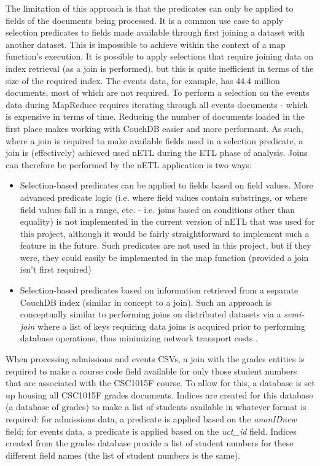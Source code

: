 The limitation of this approach is that the predicates can only be applied to fields of the documents being processed. It is a common use case to apply selection predicates to fields made available through first joining a dataset with another dataset. This is impossible to achieve within the context of a map function’s execution. It is possible to apply selections that require joining data on index retrieval (as a join is performed), but this is quite inefficient in terms of the size of the required index. The events data, for example, has 44.4 million documents, most of which are not required. To perform a selection on the events data during MapReduce requires iterating through all events documents - which is expensive in terms of time. Reducing the number of documents loaded in the first place makes working with CouchDB easier and more performant. As such, where a join is required to make available fields used in a selection predicate, a join is (effectively) achieved used nETL during the ETL phase of analysis. Joins can therefore be performed by the nETL application is two ways:

\begin{itemize}
  \item Selection-based predicates can be applied to fields based on field values. More advanced predicate logic (i.e. where field values contain substrings, or where field values fall in a range, etc. - i.e. joins based on conditions other than equality) is not implemented in the current version of nETL that was used for this project, although it would be fairly straightforward to implement such a feature in the future. Such predicates are not used in this project, but if they were, they could easily be implemented in the map function (provided a join isn't first required)
  \item Selection-based predicates based on information retrieved from a separate CouchDB index (similar in concept to a join). Such an approach is conceptually similar to performing joins on distributed datasets via a \textit{semi-join} where a list of keys requiring data joins is acquired prior to performing database operations, thus minimizing network transport costs \cite{sonia2018}.
\end{itemize}

When processing admissions and events CSVs, a join with the grades entities is required to make a course code field available for only those student numbers that are associated with the CSC1015F course. To allow for this, a database is set up housing all CSC1015F grades documents. Indices are created for this database (a database of grades) to make a list of students available in whatever format is required: for admissions data, a predicate is applied based on the \textit{anonIDnew} field; for events data, a predicate is applied based on the \textit{uct\_id} field. Indices created from the grades database provide a list of student numbers for these different field names (the list of student numbers is the same).

